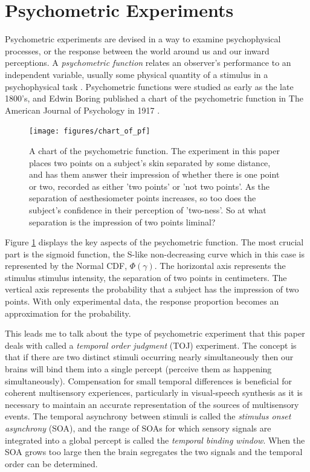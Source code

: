 \documentclass[11pt, oneside, openany]{scrbook}
\begin{document}
\hypertarget{psycho-experiments}{%
\section{Psychometric Experiments}\label{psycho-experiments}}

Psychometric experiments are devised in a way to examine psychophysical processes, or the response between the world around us and our inward perceptions. A \emph{psychometric function} relates an observer's performance to an independent variable, usually some physical quantity of a stimulus in a psychophysical task \citep{wichmann2001a}. Psychometric functions were studied as early as the late 1800's, and Edwin Boring published a chart of the psychometric function in The American Journal of Psychology in 1917 \citep{boring1917chart}.

\begin{figure}

{\centering \texttt{[image: figures/chart\_of\_pf]} 

}

\caption{A chart of the psychometric function. The experiment in this paper places two points on a subject's skin separated by some distance, and has them answer their impression of whether there is one point or two, recorded as either 'two points' or 'not two points'. As the separation of aesthesiometer points increases, so too does the subject's confidence in their perception of 'two-ness'. So at what separation is the impression of two points liminal?}\label{fig:ch020-chart-of-pf}
\end{figure}

Figure \ref{fig:ch020-chart-of-pf} displays the key aspects of the psychometric function. The most crucial part is the sigmoid function, the S-like non-decreasing curve which in this case is represented by the Normal CDF, \(\Phi(\gamma)\). The horizontal axis represents the stimulus stimulus intensity, the separation of two points in centimeters. The vertical axis represents the probability that a subject has the impression of two points. With only experimental data, the response proportion becomes an approximation for the probability.

This leads me to talk about the type of psychometric experiment that this paper deals with called a \emph{temporal order judgment} (TOJ) experiment. The concept is that if there are two distinct stimuli occurring nearly simultaneously then our brains will bind them into a single percept (perceive them as happening simultaneously). Compensation for small temporal differences is beneficial for coherent multisensory experiences, particularly in visual-speech synthesis as it is necessary to maintain an accurate representation of the sources of multisensory events. The temporal asynchrony between stimuli is called the \emph{stimulus onset asynchrony} (SOA), and the range of SOAs for which sensory signals are integrated into a global percept is called the \emph{temporal binding window}. When the SOA grows too large then the brain segregates the two signals and the temporal order can be determined.
\end{document}

